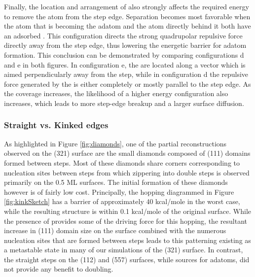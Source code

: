 Finally, the location and arrangement of  also strongly affects the
required energy to remove the atom from the step edge. Separation becomes most
favorable when the atom that is becoming the adatom and the atom directly
behind it both have an adsorbed . This configuration directs the strong
quadrupolar repulsive force directly away from the step edge, thus lowering the
energetic barrier for adatom formation.  This conclusion can be demonstrated by
comparing configurations d and e in both figures. In configuration e, the
 are located along a vector which is aimed perpendicularly away from the
step, while in configuration d the repulsive force generated by the  is
either completely or mostly parallel to the step edge. As the coverage
increases, the likelihood of a higher energy configuration also increases,
which leads to more step-edge breakup and a larger surface diffusion.

\subsubsection{Straight vs. Kinked edges}
As highlighted in Figure \ref{fig:diamonds}, one of the partial reconstructions
observed on the (321) surface are the small diamonds composed of (111) domains
formed between steps. Most of these diamonds share corners corresponding to
nucleation sites between steps from which zippering into double steps is
observed primarily on the 0.5 ML surfaces. The initial formation of these
diamonds however is of fairly low cost. Principally, the hopping
diagrammed in Figure \ref{fig:kinkSketch} has a barrier of approximately 40
kcal/mole in the worst case, while the resulting structure is within 0.1 kcal/mole of the original
surface. While the presence of  provides some of the driving force for
this hopping, the resultant increase in (111) domain size on the surface
combined with the numerous nucleation sites that are formed between steps leads
to this patterning existing as a metastable state in many of our simulations of
the (321) surface. In contrast, the straight steps on the (112) and (557)
surfaces, while sources for adatoms, did not provide any benefit to doubling.

